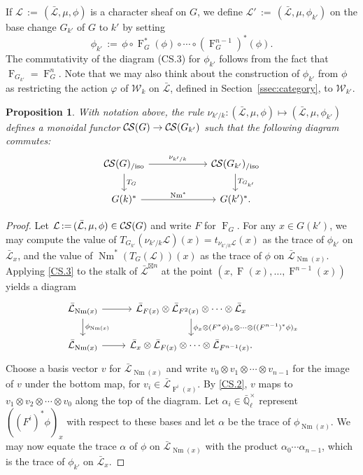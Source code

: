 \documentclass[10pt]{amsart}
\theoremstyle{plain}
\newtheorem{proposition}[theorem]{Proposition}
\theoremstyle{definition}
\newcommand{\EE}{\mathbb{\bar Q}_\ell}
\newcommand{\EEx}{\EE^\times}
\newcommand{\Weil}[1]{\mathcal{W}_{#1}}
\newcommand{\Frob}[1]{\operatorname{F}_{#1}}
\DeclareMathOperator{\Nm}{Nm}
\newcommand{\ceq}{{\, :=\, }}
\newcommand{\TrFrob}[1]{T_{#1}}
\newcommand{\cs}[1]{{\mathcal{#1}}}
\newcommand{\gcs}[1]{{\mathcal{\bar #1}}}
\newcommand{\CS}{{\mathcal{C\hskip-0.8pt S}}}
\newcommand{\CSiso}[1]{\CS(#1)_{/\text{iso}}}
\begin{document}
If $\cs{L} \ceq (\gcs{L}, \mu, \phi)$ is a character sheaf on $G$, we define
$\cs{L}' \ceq (\gcs{L}, \mu, \phi_{k'})$ on the base change
$G_{k'}$ of $G$ to $k'$ by setting
\[
\phi_{k'} \ceq \phi \circ \Frob{G}^*(\phi) \circ \cdots \circ (\Frob{G}^{n-1})^*(\phi).
\]
The commutativity of the diagram (CS.3) for $\phi_{k'}$
follows from the fact that $\Frob{G_{k'}} = \Frob{G}^n$.
Note that we may also think about the construction of $\phi_{k'}$ from $\phi$
as restricting the action $\varphi$ of $\Weil{k}$ on $\gcs{L}$,
defined in Section~\ref{ssec:category}, to $\Weil{k'}$.

\begin{proposition}\label{prop:basechange}
With notation above,
the rule $\nu_{k'/k}: (\gcs{L}, \mu, \phi) \mapsto (\gcs{L}, \mu, \phi_{k'})$
 defines a monoidal functor $\CS(G) \to \CS(G_{k'})$
 such that the following diagram commutes:
\[
\begin{tikzcd}[column sep=60]
\CSiso{G} \rar{\nu_{k'/k}} \dar{\TrFrob{G}} & \CSiso{G_{k'}} \dar{\TrFrob{G_{k'}}} \\
G(k)^*  \rar{\Nm^*} & G(k')^*.
\end{tikzcd}
\]
\end{proposition}

\begin{proof}
Let $\cs{L} \ceq (\gcs{L}, \mu, \phi) \in \CS(G)$ and write $F$ for $\Frob{G}$.  For any $x \in G(k')$,
we may compute the value of $\TrFrob{G_{k'}}(\nu_{k'/k}\cs{L})(x)= t_{\nu_{k'/k}\cs{L}}(x)$ as the trace of $\phi_{k'}$ on $\gcs{L}_x$,
and the value of $\Nm^*(\TrFrob{G}(\cs{L}))(x)$ as the trace of $\phi$ on $\gcs{L}_{\Nm(x)}$.
Applying \ref{CS.3} to the stalk of $\gcs{L}^{\boxtimes n}$ at the point $(x, \Frob{}(x), \ldots, \Frob{}^{n-1}(x))$ yields a diagram
\[
\begin{tikzcd}
\gcs{L}_{\Nm(x)} \rar \dar{\phi_{\Nm(x)}} & \gcs{L}_{F(x)} \otimes \gcs{L}_{F^2(x)} \otimes \cdots \otimes \gcs{L}_x
\dar{\phi_x \otimes (F^*\phi)_x \otimes \cdots \otimes ((F^{n-1})^*\phi)_x} \\
\gcs{L}_{\Nm(x)} \rar & \gcs{L}_x \otimes \gcs{L}_{F(x)} \otimes \cdots \otimes \gcs{L}_{F^{n-1}(x)}.
\end{tikzcd}
\]
Choose a basis vector $v$ for $\gcs{L}_{\Nm(x)}$ and write $v_0 \otimes v_1 \otimes \cdots \otimes v_{n-1}$ for the image of $v$ under the
bottom map,
for $v_i \in \gcs{L}_{\Frob{}^i(x)}$.  By \ref{CS.2}, $v$ maps to
$v_1 \otimes v_2 \otimes \cdots \otimes v_0$ along the top of the diagram.
Let $\alpha_i \in \EEx$ represent $((F^i)^*\phi)_x$ with respect to these bases and let $\alpha$ be
the trace of $\phi_{\Nm(x)}$.  We may now equate the trace $\alpha$ of $\phi$ on $\gcs{L}_{\Nm(x)}$
with the product $\alpha_0 \cdots \alpha_{n-1}$, which is the trace of $\phi_{k'}$ on $\gcs{L}_x$.
\end{proof}
\end{document}
